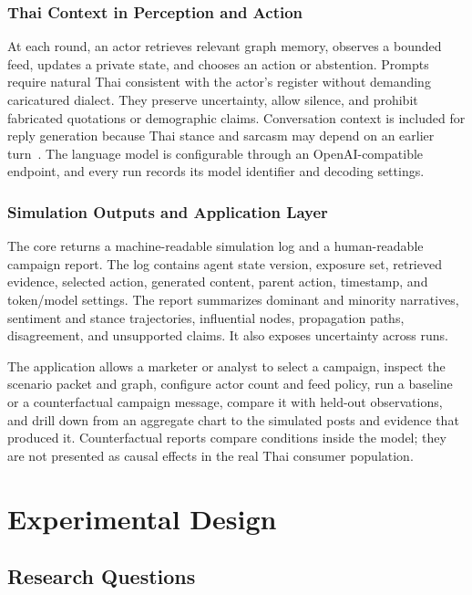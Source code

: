 \documentclass[conference]{IEEEtran}
\begin{document}
\subsubsection{Thai Context in Perception and Action}

At each round, an actor retrieves relevant graph memory, observes a bounded
feed, updates a private state, and chooses an action or abstention. Prompts
require natural Thai consistent with the actor's register without demanding
caricatured dialect. They preserve uncertainty, allow silence, and prohibit
fabricated quotations or demographic claims. Conversation context is included
for reply generation because Thai stance and sarcasm may depend on an earlier
turn~\cite{hazarika2018cascade}. The language model is configurable through an
OpenAI-compatible endpoint, and every run records its model identifier and
decoding settings.

\subsubsection{Simulation Outputs and Application Layer}

The core returns a machine-readable simulation log and a human-readable
campaign report. The
log contains agent state version, exposure set, retrieved evidence, selected
action, generated content, parent action, timestamp, and token/model settings.
The report summarizes dominant and minority narratives, sentiment and stance
trajectories, influential nodes, propagation paths, disagreement, and
unsupported claims. It also exposes uncertainty across runs.

The application allows a marketer or analyst to select a campaign, inspect the
scenario packet and graph, configure actor count and feed policy, run a
baseline or a counterfactual campaign message, compare it with held-out
observations, and drill down from an aggregate chart to the simulated posts
and evidence that produced it. Counterfactual reports compare conditions
inside the model; they are not presented as causal effects in the real Thai
consumer population.

\section{Experimental Design}

\subsection{Research Questions}
\end{document}
